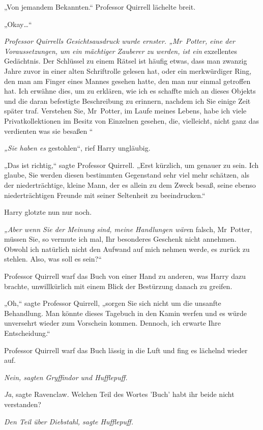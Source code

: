 {„Von jemandem Bekannten.“ Professor Quirrell lächelte breit.

„Okay…“

\emph{Professor Quirrells Gesichtsausdruck wurde ernster. „Mr~Potter, eine der Voraussetzungen, um ein mächtiger Zauberer zu werden, ist ein} exzellentes Gedächtnis. Der Schlüssel zu einem Rätsel ist häufig etwas, dass man zwanzig Jahre zuvor in einer alten Schriftrolle gelesen hat, oder ein merkwürdiger Ring, den man am Finger eines Mannes gesehen hatte, den man nur einmal getroffen hat. Ich erwähne dies, um zu erklären, wie ich es schaffte mich an dieses Objekts und die daran befestigte Beschreibung zu erinnern, nachdem ich Sie einige Zeit später traf. Verstehen Sie, Mr~Potter, im Laufe meines Lebens, habe ich viele Privatkollektionen im Besitz von Einzelnen gesehen, die, vielleicht, nicht ganz das verdienten was sie besaßen \later“

\emph{„Sie haben es} gestohlen“, rief Harry ungläubig.

„Das ist richtig,“ sagte Professor Quirrell. „Erst kürzlich, um genauer zu sein. Ich glaube, Sie werden diesen bestimmten Gegenstand sehr viel mehr schätzen, als der niederträchtige, kleine Mann, der es allein zu dem Zweck besaß, seine ebenso niederträchtigen Freunde mit seiner Seltenheit zu beeindrucken.“

Harry glotzte nun nur noch.

\emph{„Aber wenn Sie der Meinung sind, meine Handlungen wäre}n falsch, Mr~Potter, müssen Sie, so vermute ich mal, Ihr besonderes Geschenk nicht annehmen. Obwohl ich natürlich nicht den Aufwand auf mich nehmen werde, es zurück zu stehlen. Also, was soll es sein?“

Professor Quirrell warf das Buch von einer Hand zu anderen, was Harry dazu brachte, unwillkürlich mit einem Blick der Bestürzung danach zu greifen.

„Oh,“ sagte Professor Quirrell, „sorgen Sie sich nicht um die unsanfte Behandlung. Man könnte dieses Tagebuch in den Kamin werfen und es würde unversehrt wieder zum Vorschein kommen. Dennoch, ich erwarte Ihre Entscheidung.“

Professor Quirrell warf das Buch lässig in die Luft und fing es lächelnd wieder auf.

\emph{Nein, sagten Gryffindor und Hufflepuff.}

\emph{Ja}, sagte Ravenclaw. Welchen Teil des Wortes 'Buch' habt ihr beide nicht verstanden?

\emph{Den Teil über Diebstahl, sagte Hufflepuff.}

}

